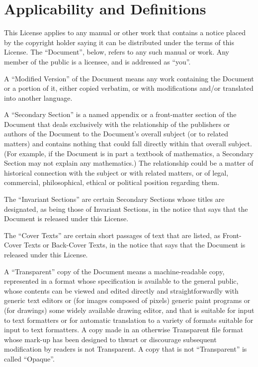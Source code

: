 \documentclass[12pt,twoside,openright,a4paper]{book}
\begin{document}
	\section{Applicability and Definitions}

	This License applies to any manual or other work that contains a
	notice placed by the copyright holder saying it can be distributed
	under the terms of this License.  The ``Document'', below, refers to any
	such manual or work.  Any member of the public is a licensee, and is
	addressed as ``you''.

	A ``Modified Version'' of the Document means any work containing the
	Document or a portion of it, either copied verbatim, or with
	modifications and/or translated into another language.

	A ``Secondary Section'' is a named appendix or a front-matter section of
	the Document that deals exclusively with the relationship of the
	publishers or authors of the Document to the Document's overall subject
	(or to related matters) and contains nothing that could fall directly
	within that overall subject.  (For example, if the Document is in part a
	textbook of mathematics, a Secondary Section may not explain any
	mathematics.)  The relationship could be a matter of historical
	connection with the subject or with related matters, or of legal,
	commercial, philosophical, ethical or political position regarding
	them.

	The ``Invariant Sections'' are certain Secondary Sections whose titles
	are designated, as being those of Invariant Sections, in the notice
	that says that the Document is released under this License.

	The ``Cover Texts'' are certain short passages of text that are listed,
	as Front-Cover Texts or Back-Cover Texts, in the notice that says that
	the Document is released under this License.

	A ``Transparent'' copy of the Document means a machine-readable copy,
	represented in a format whose specification is available to the
	general public, whose contents can be viewed and edited directly and
	straightforwardly with generic text editors or (for images composed of
	pixels) generic paint programs or (for drawings) some widely available
	drawing editor, and that is suitable for input to text formatters or
	for automatic translation to a variety of formats suitable for input
	to text formatters.  A copy made in an otherwise Transparent file
	format whose mark-up has been designed to thwart or discourage
	subsequent modification by readers is not Transparent.  A copy that is
	not ``Transparent'' is called ``Opaque''.
\end{document}

